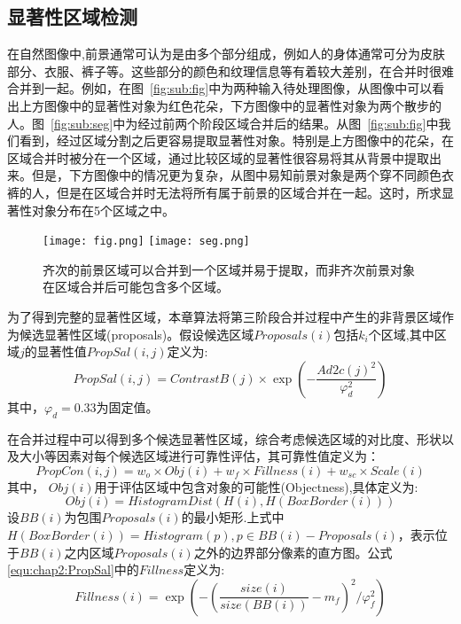 \par
\subsection{显著性区域检测}
\label{subsec:saliency}

在自然图像中,前景通常可认为是由多个部分组成，例如人的身体通常可分为皮肤部分、衣服、裤子等。这些部分的颜色和纹理信息等有着较大差别，在合并时很难合并到一起。例如，在图~\ref{fig:sub:fig}中为两种输入待处理图像，从图像中可以看出上方图像中的显著性对象为红色花朵，下方图像中的显著性对象为两个散步的人。图~\ref{fig:sub:seg}中为经过前两个阶段区域合并后的结果。从图~\ref{fig:sub:fig}中我们看到，经过区域分割之后更容易提取显著性对象。特别是上方图像中的花朵，在区域合并时被分在一个区域，通过比较区域的显著性很容易将其从背景中提取出来。但是，下方图像中的情况更为复杂，从图中易知前景对象是两个穿不同颜色衣裤的人，但是在区域合并时无法将所有属于前景的区域合并在一起。这时，所求显著性对象分布在5个区域之中。

\begin{figure}[htb]
  \centering%
    {\texttt{[image: fig.png]}}%
 \hspace{1em}%
      {\texttt{[image: seg.png]}}

  \caption{齐次的前景区域可以合并到一个区域并易于提取，而非齐次前景对象在区域合并后可能包含多个区域。}
  \label{fig:fgseg}
\end{figure}

\par
为了得到完整的显著性区域，本章算法将第三阶段合并过程中产生的非背景区域作为候选显著性区域(proposals)。假设候选区域$Proposals(i)$包括$k_i$个区域,其中区域$j$的显著性值$PropSal(i,j)$定义为:
$$
   PropSal(i,j)=ContrastB(j) \times \exp{(-\frac{Ad2c(j)^2}{\varphi_d^2 })}
$$
其中，$\varphi_d=0.33$为固定值。\par
在合并过程中可以得到多个候选显著性区域，综合考虑候选区域的对比度、形状以及大小等因素对每个候选区域进行可靠性评估，其可靠性值定义为：
\begin{equation}
   \label{equ:chap2:PropSal}
   PropCon(i,j)=w_o \times Obj(i) + w_f \times Fillness(i) + w_{sc} \times Scale(i)
\end{equation}
其中， $Obj(i)$用于评估区域中包含对象的可能性(Objectness)\cite{objectness},具体定义为:
$$Obj(i) = HistogramDist(H(i),H(BoxBorder(i)))$$
设$BB(i)$为包围$Proposals(i)$的最小矩形.上式中$H(BoxBorder(i))=Histogram(p), p \in BB(i)-Proposals(i)$，表示位于$BB(i)$之内区域$Proposals(i)$之外的边界部分像素的直方图。公式\ref{equ:chap2:PropSal}中的$Fillness$定义为:
$$ Fillness(i) = \exp({-(\frac{size(i)}{size(BB(i))}-m_f)^2}/\varphi_f^2)$$ \par

